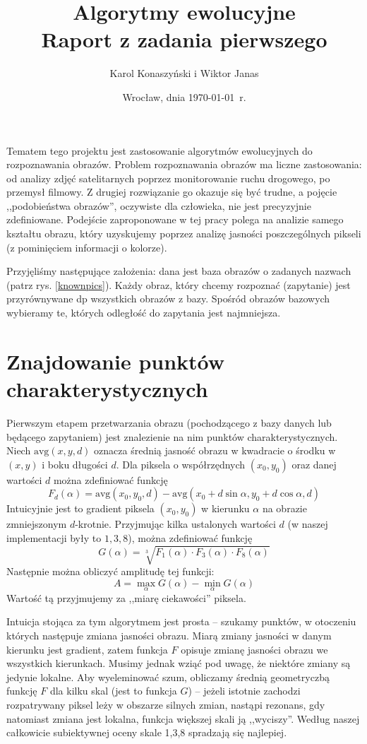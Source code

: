 \documentclass[a4paper,12pt,leqno]{article}
\title{\textbf{Algorytmy ewolucyjne}\\
       {\Large Raport z zadania pierwszego}\\[-1ex]}
\author{Karol Konaszyński i Wiktor Janas}
\date{Wrocław, dnia \today\ r.}
\newcommand{\avg}{\mathrm{avg}}
\begin{document}
\maketitle

Tematem tego projektu jest zastosowanie algorytmów ewolucyjnych do rozpoznawania obrazów. 
Problem rozpoznawania obrazów ma liczne zastosowania: od analizy zdjęć satelitarnych poprzez monitorowanie ruchu drogowego, po przemysł filmowy.
Z drugiej rozwiązanie go okazuje się być trudne, a pojęcie ,,podobieństwa obrazów'', oczywiste dla człowieka, nie jest precyzyjnie zdefiniowane.
Podejście zaproponowane w tej pracy polega na analizie samego kształtu obrazu, który uzyskujemy poprzez analizę jasności poszczególnych
pikseli (z pominięciem informacji o kolorze).

Przyjęliśmy następujące założenia: dana jest baza obrazów o zadanych nazwach (patrz rys. \ref{knownpics}). Każdy obraz, który chcemy rozpoznać
(zapytanie) jest przyrównywane dp wszystkich obrazów z bazy. Spośród obrazów bazowych wybieramy te, których odległość do zapytania jest najmniejsza.

\section{Znajdowanie punktów charakterystycznych}
Pierwszym etapem przetwarzania obrazu (pochodzącego z bazy danych lub będącego zapytaniem) jest znalezienie na nim punktów charakterystycznych.
Niech $\avg(x,y,d)$ oznacza średnią jasność obrazu w kwadracie o środku w $(x,y)$ i boku długości $d$. Dla piksela o współrzędnych $(x_0,y_0)$ oraz danej
wartości $d$ można zdefiniować funkcję
\[ F_d(\alpha) = \avg(x_0,y_0,d) - \avg( x_0+d\sin\alpha, y_0+d\cos\alpha, d) \]
Intuicyjnie jest to gradient piksela $(x_0,y_0)$ w kierunku $\alpha$ na obrazie zmniejszonym $d$-krotnie. Przyjmując kilka ustalonych wartości $d$
(w naszej implementacji były to $1,3,8$), można zdefiniować funkcję
\[ G(\alpha) = \sqrt[3]{F_1(\alpha) \cdot F_3(\alpha) \cdot F_8(\alpha)} \]
Następnie można obliczyć amplitudę tej funkcji:
\[ A = \max_\alpha G(\alpha) - \min_\alpha G(\alpha) \]
Wartość tą przyjmujemy za ,,miarę ciekawości'' piksela. 

Intuicja stojąca za tym algorytmem jest prosta -- szukamy punktów, w otoczeniu których następuje zmiana jasności obrazu. Miarą zmiany jasności w danym
kierunku jest gradient, zatem funkcja $F$ opisuje zmianę jasności obrazu we wszystkich kierunkach. Musimy jednak wziąć pod uwagę, że niektóre zmiany są
jedynie lokalne. Aby wyeleminować szum, obliczamy średnią geometryczbą funkcję $F$ dla kilku skal (jest to funkcja $G$) -- jeżeli istotnie zachodzi
rozpatrywany piksel leży w obszarze silnych zmian, nastąpi rezonans, gdy natomiast zmiana jest lokalna, funkcja większej skali ją ,,wyciszy''.
Według naszej całkowicie subiektywnej oceny skale 1,3,8 spradzają się najlepiej.
\end{document}
